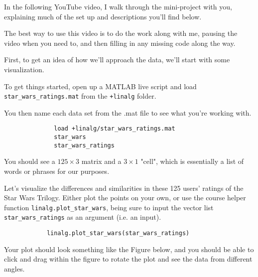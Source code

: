 \documentclass{ximera}
\begin{document}
\begin{exploration}
  \vspace{1em}

  \begin{remark}
  
    In the following YouTube video, I walk through the mini-project with you, explaining much of the set up and descriptions you'll find below. 
    
    The best way to use this video is to do the work along with me, pausing the video when you need to, and then filling in any missing code along the way.

    \begin{center}
    \end{center}

  \end{remark}

  First, to get an idea of how we'll approach the data, we'll start with some visualization.

  To get things started, open up a MATLAB live script and load \texttt{star\_wars\_ratings.mat} from the \texttt{+linalg} folder.

  You then name each data set from the .mat file to see what you're working with.

  \begin{remark}
          \begin{verbatim}
              load +linalg/star_wars_ratings.mat
              star_wars
              star_wars_ratings
          \end{verbatim}
  \end{remark}

  You should see a $125\times 3$ matrix and a $3\times 1$ "cell", which is essentially a list of words or phrases for our purposes.

  Let's visualize the differences and similarities in these 125 users' ratings of the Star Wars Trilogy. Either plot the points on your own, or use the course helper function \texttt{linalg.plot\_star\_wars}, being sure to input the vector list \texttt{star\_wars\_ratings} as an argument (i.e. an input).

  \begin{remark}
        \begin{verbatim}
            linalg.plot_star_wars(star_wars_ratings)
        \end{verbatim}
  \end{remark}

  Your plot should look something like the Figure below, and you should be able to click and drag within the figure to rotate the plot and see the data from different angles.


\end{exploration}
\end{document}
